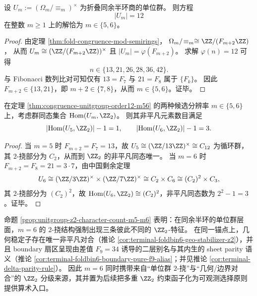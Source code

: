 \begin{theorem}\label{thm:congruence-unitgroup-order12-m56}
设 \(U_m:=(\Omega_m/\!\equiv_m)^\times\) 为折叠同余半环商的单位群。
则方程
\[
|U_m|=12
\]
在整数 \(m\ge 1\) 上的解恰为 \(m\in\{5,6\}\)。
\end{theorem}
\begin{proof}
由定理 \ref{thm:fold-congruence-mod-semirings}，
\(
\Omega_m/\!\equiv_m\cong \ZZ/(F_{m+2}\ZZ)
\)，
从而
\(
U_m\cong (\ZZ/(F_{m+2}\ZZ))^\times
\)
且 \(|U_m|=\varphi(F_{m+2})\)。
求解 \(\varphi(n)=12\) 可得
\[
n\in\{13,21,26,28,36,42\}.
\]
与 Fibonacci 数列比对可知仅有 \(13=F_7\) 与 \(21=F_8\) 属于 \(\{F_k\}\)。
因此 \(F_{m+2}\in\{13,21\}\)，即 \(m+2\in\{7,8\}\)，从而 \(m\in\{5,6\}\)。证毕。
\end{proof}

\begin{proposition}\label{prop:unitgroup-z2-character-count-m5-m6}
在定理 \ref{thm:congruence-unitgroup-order12-m56} 的两种候选分辨率 \(m\in\{5,6\}\) 上，考虑群同态集合 \(\mathrm{Hom}(U_m,\ZZ_2)\)。
则其非平凡元素数目满足
\[
|\mathrm{Hom}(U_5,\ZZ_2)|-1=1,\qquad
|\mathrm{Hom}(U_6,\ZZ_2)|-1=3.
\]
\end{proposition}
\begin{proof}
当 \(m=5\) 时 \(F_{m+2}=F_7=13\)，故
\(
U_5\cong (\ZZ/13\ZZ)^\times\cong C_{12}
\)
为循环群，其 \(2\)-挠部分为 \(C_2\)，从而到 \(\ZZ_2\) 的非平凡同态唯一。
当 \(m=6\) 时 \(F_{m+2}=F_8=21=3\cdot 7\)，由中国剩余定理
\[
U_6\cong (\ZZ/3\ZZ)^\times\times(\ZZ/7\ZZ)^\times\cong C_2\times C_6\cong (C_2)^2\times C_3,
\]
其 \(2\)-挠部分为 \((C_2)^2\)，故 \(\mathrm{Hom}(U_6,\ZZ_2)\cong (C_2)^2\)，非平凡同态数为 \(2^2-1=3\)。证毕。
\end{proof}

\begin{remark}\label{rem:unitgroup-z2-shadow-versus-geo-bdry-z2}
命题 \ref{prop:unitgroup-z2-character-count-m5-m6} 表明：在同余半环的单位群层面，\(m=6\) 的 \(2\)-挠结构强制出现三条彼此不同的 \(\ZZ_2\)-特征。
在同一锚点上，几何稳定子存在唯一非平凡对合（推论 \ref{cor:terminal-foldbin6-geo-stabilizer-z2}），并且 boundary 扇区呈现由差值 \(F_9=34\) 诱导的二层别名与其内生的 sheet parity 语义（推论 \ref{cor:terminal-foldbin6-boundary-pure-f9-alias}；并见推论 \ref{cor:terminal-delta-parity-rule}）。
因此 \(m=6\) 同时携带来自“单位群 \(2\)-挠”与“几何/边界对合”的 \(\ZZ_2\) 分级来源，其并置为后续把多重 \(\ZZ_2\) 约束函子化为可观测选择原则提供算术入口。
\end{remark}

